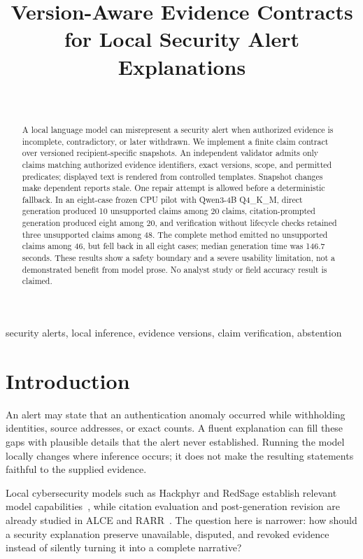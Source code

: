 \title{Version-Aware Evidence Contracts for Local Security Alert Explanations}
\author{\\}
\maketitle
\begin{abstract}
A local language model can misrepresent a security alert when authorized evidence is incomplete, contradictory, or later withdrawn. We implement a finite claim contract over versioned recipient-specific snapshots. An independent validator admits only claims matching authorized evidence identifiers, exact versions, scope, and permitted predicates; displayed text is rendered from controlled templates. Snapshot changes make dependent reports stale. One repair attempt is allowed before a deterministic fallback. In an eight-case frozen CPU pilot with Qwen3-4B Q4\_K\_M, direct generation produced 10 unsupported claims among 20 claims, citation-prompted generation produced eight among 20, and verification without lifecycle checks retained three unsupported claims among 48. The complete method emitted no unsupported claims among 46, but fell back in all eight cases; median generation time was 146.7 seconds. These results show a safety boundary and a severe usability limitation, not a demonstrated benefit from model prose. No analyst study or field accuracy result is claimed.
\end{abstract}
\begin{IEEEkeywords}security alerts, local inference, evidence versions, claim verification, abstention\end{IEEEkeywords}

\section{Introduction}
An alert may state that an authentication anomaly occurred while withholding identities, source addresses, or exact counts. A fluent explanation can fill these gaps with plausible details that the alert never established. Running the model locally changes where inference occurs; it does not make the resulting statements faithful to the supplied evidence.

Local cybersecurity models such as Hackphyr and RedSage establish relevant model capabilities~\cite{hackphyr,redsage}, while citation evaluation and post-generation revision are already studied in ALCE and RARR~\cite{alce,rarr}. The question here is narrower: how should a security explanation preserve unavailable, disputed, and revoked evidence instead of silently turning it into a complete narrative?

